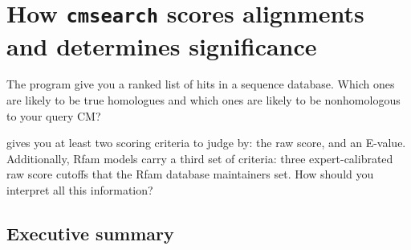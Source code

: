 \section{How \texttt{cmsearch} scores alignments and determines significance}

The  program give you a ranked list of hits in a
sequence database.  Which ones are likely to be true homologues and
which ones are likely to be nonhomologous to your query CM?

 gives you at least two scoring criteria to judge
by: the  raw score, and an E-value. Additionally,
Rfam models carry a third set of criteria: three expert-calibrated raw
score cutoffs that the Rfam database maintainers set. How should you
interpret all this information?
\subsection{Executive summary}

